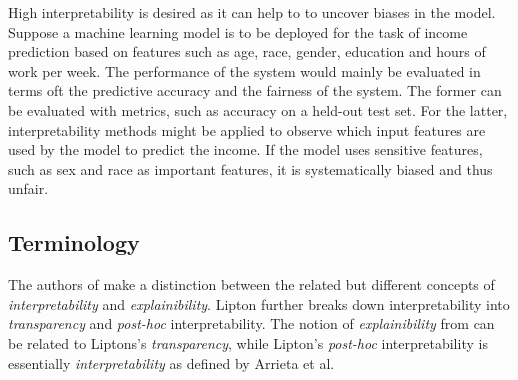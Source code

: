 




High interpretability is desired as it can help to to uncover biases in the model. Suppose a machine learning model is to be deployed for the task of income prediction based on features such as age, race, gender, education and hours of work per week. The performance of the system would mainly be evaluated in terms oft the predictive accuracy and the fairness of the system. The former can be evaluated with metrics, such as accuracy on a held-out test set. For the latter, interpretability methods might be applied to observe which input features are used by the model to predict the income. 
If the model uses sensitive features, such as sex and race as important features, it is systematically biased and thus unfair. 


\subsection{Terminology}
\label{subsec:interpretation_methods_terminology}
The authors of \cite{arrieta2020explainable} make a distinction between the related but different concepts of \textit{interpretability} and \textit{explainibility}. Lipton \cite{lipton2018mythos} further breaks down interpretability into \textit{transparency} and \textit{post-hoc} interpretability. The notion of \textit{explainibility} from \cite{arrieta2020explainable} can be related to Liptons's \textit{transparency}, while Lipton's \textit{post-hoc} interpretability is essentially \textit{interpretability} as defined by Arrieta et al. 


